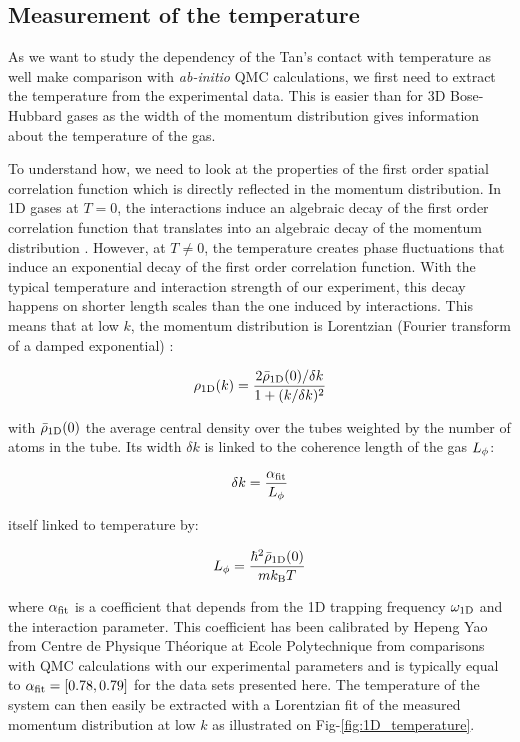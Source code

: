 \subsection{Measurement of the temperature}

\label{sec:1D_temperature}

As we want to study the dependency of the Tan's contact with temperature as well make comparison with {\it ab-initio} QMC calculations, we first need to extract the temperature from the experimental data. This is easier than for 3D Bose-Hubbard gases as the width of the momentum distribution gives information about the temperature of the gas. 

To understand how, we need to look at the properties of the first order spatial correlation function which is directly reflected in the momentum distribution. In 1D gases at $T=0$, the interactions induce an algebraic decay of the first order correlation function that translates into an algebraic decay of the momentum distribution \cite{gangardt2003stability,pitaevskii1991}. However, at $T \neq 0$, the temperature creates phase fluctuations that induce an exponential decay of the first order correlation function. With the typical temperature and interaction strength of our experiment, this decay happens on shorter length scales than the one induced by interactions. This means that at low $k$, the momentum distribution is Lorentzian (Fourier transform of a damped exponential) \cite{cazalilla2004bosonizing,fabbri2011momentum,gerbier2004condensat}:

\begin{equation}
    \rho_{\rm{1D}}(k)=\frac{2 \bar{\rho}_{\rm{1D}}(0)/\delta k }{1+(k/\delta k)^2}
\end{equation}

\noindent with $\bar{\rho}_{\rm{1D}}(0)$ the average central density over the tubes weighted by the number
of atoms in the tube. Its width $\delta k$ is linked to the coherence length of the gas $L_{\rm{\phi}}$:

\begin{equation}
    \delta k= \frac{\alpha_{\rm{fit}}}{L_{\phi}} 
\end{equation}

\noindent itself linked to temperature by:

\begin{equation}
    {L_{\phi}} = \frac{\hbar^2 \bar{\rho}_{\rm{1D}}(0)}{m k_{\mathrm{B}} T}
\end{equation}

\noindent where $\alpha_{\rm{fit}}$ is a coefficient that depends from the 1D trapping frequency $\omega_{\rm{1D}}$ and the interaction parameter. This coefficient has been calibrated by Hepeng Yao from Centre de Physique Théorique at Ecole Polytechnique from comparisons with QMC calculations with our experimental parameters and is typically equal to $\alpha_{\rm{fit}} = [0.78,0.79]$ for the data sets presented here. The temperature of the system can then easily be extracted with a Lorentzian fit of the measured momentum distribution at low $k$ as illustrated on Fig-\ref{fig:1D_temperature}.

